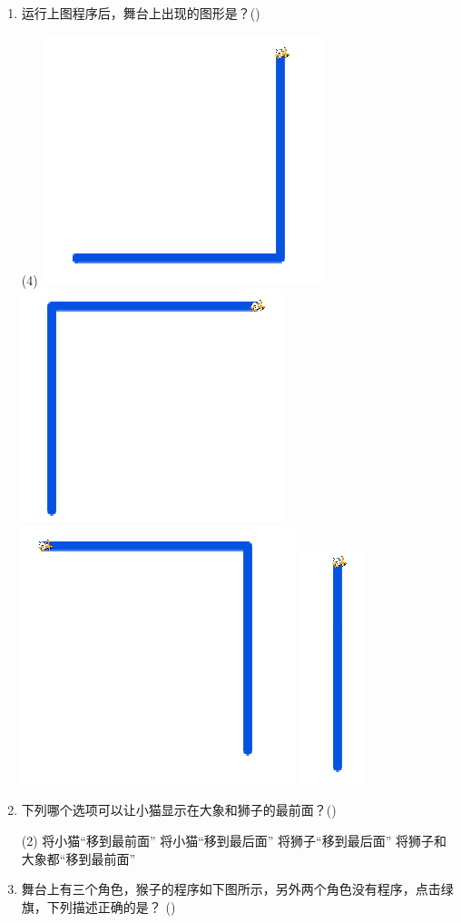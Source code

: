 \documentclass[10pt, a4paper]{article}
\newcommand{\hq}{\hfill(\qquad)}
\begin{document}
\begin{enumerate}
        \item 运行上图程序后，舞台上出现的图形是？\hq
        \begin{tasks}(4)
            \task \includegraphics[width=.12\textwidth]{figure/20a.png}
            \task \includegraphics[width=.12\textwidth]{figure/20b.png}
            \task \includegraphics[width=.12\textwidth]{figure/20c.png}
            \task \includegraphics[width=.03\textwidth]{figure/20d.png}
        \end{tasks}

        \item 下列哪个选项可以让小猫显示在大象和狮子的最前面？\hq
        \begin{tasks}(2)
            \task 将小猫“移到最前面”
            \task 将小猫“移到最后面”
            \task 将狮子“移到最后面”
            \task 将狮子和大象都“移到最前面”
        \end{tasks}

        \item 舞台上有三个角色，猴子的程序如下图所示，另外两个角色没有程序，点击绿旗，下列描述正确的是？ \hq
        

\end{enumerate}
\end{document}
